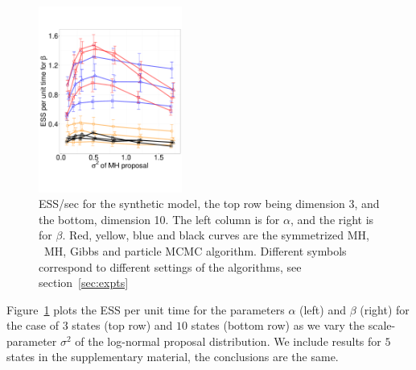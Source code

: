 \begin{figure}
\begin{minipage}[!hp]{0.95\linewidth}
    \vspace{-0 in}
    \includegraphics [width=0.42\textwidth, angle=0]{figs/exp_10_beta.pdf}
    \vspace{-0 in}
  \end{minipage}
    \caption{ESS/sec for the synthetic  model, the top row being dimension 3, and the bottom,
      dimension 10. The left column is for $\alpha$, and the 
    right is for $\beta$. Red, yellow, blue and black curves are the symmetrized MH,
  \naive\ MH, Gibbs and particle MCMC algorithm. Different symbols correspond
to different settings of the algorithms, see section~\ref{sec:expts}}
     \label{fig:ESS_EXP_D10}
  \end{figure}
  Figure~\ref{fig:ESS_EXP_D10} plots the ESS per unit time for the parameters 
  $\alpha$ (left) and $\beta$ (right) for the
  case of $3$ states (top row) and $10$ states (bottom row) as we vary the scale-parameter $\sigma^2$ of the
  log-normal proposal distribution. We include results for $5$ states in the 
  supplementary material, the conclusions are the same. 

